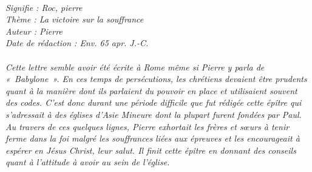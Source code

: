 \BFont
\noindent\hrulefill
\textit{
\bigskip
{\centering{}
\\Signifie : Roc, pierre
\\Thème : La victoire sur la souffrance
\\Auteur : Pierre
\\Date de rédaction : Env. 65 apr. J.-C.\\}
}
\textit{
\\Cette lettre semble avoir été écrite à Rome même si Pierre y parla de « Babylone ». En ces temps de persécutions, les chrétiens devaient être prudents quant à la manière dont ils parlaient du pouvoir en place et utilisaient souvent des codes. C’est donc durant une période difficile que fut rédigée cette épître qui s’adressait à des églises d’Asie Mineure dont la plupart furent fondées par Paul. Au travers de ces quelques lignes, Pierre exhortait les frères et sœurs à tenir ferme dans la foi malgré les souffrances liées aux épreuves et les encourageait à espérer en Jésus Christ, leur salut. Il finit cette épître en donnant des conseils quant à l’attitude à avoir au sein de l’église.\bigskip
}
\par\nobreak\noindent\hrulefill
